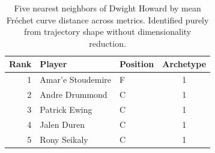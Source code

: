 \begin{table}[htbp]
  \centering\small
  \begin{tabular}{rllc}
    \toprule
    Rank & Player & Position & Archetype \\
    \midrule
    1 & Amar'e Stoudemire & F & 1 \\
    2 & Andre Drummond & C & 1 \\
    3 & Patrick Ewing & C & 1 \\
    4 & Jalen Duren & C & 1 \\
    5 & Rony Seikaly & C & 1 \\
    \bottomrule
  \end{tabular}
  \caption{Five nearest neighbors of Dwight Howard by mean Fr\'{e}chet curve distance across metrics. Identified purely from trajectory shape without dimensionality reduction.}
  \label{tab:Dwight_Howard_frechet_curve_neighbors}
\end{table}

